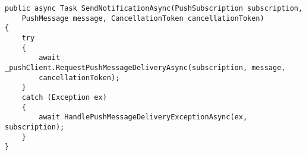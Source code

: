 \begin{minipage}{0.95\linewidth}
    \begin{lstlisting}[caption={Code snippet of a push notification implementation.}, label={pushoverpollcode}]
public async Task SendNotificationAsync(PushSubscription subscription, 
    PushMessage message, CancellationToken cancellationToken)
{
    try
    {
        await _pushClient.RequestPushMessageDeliveryAsync(subscription, message, 
        cancellationToken);
    }
    catch (Exception ex)
    {
        await HandlePushMessageDeliveryExceptionAsync(ex, subscription);
    }
}
    \end{lstlisting}
\end{minipage}